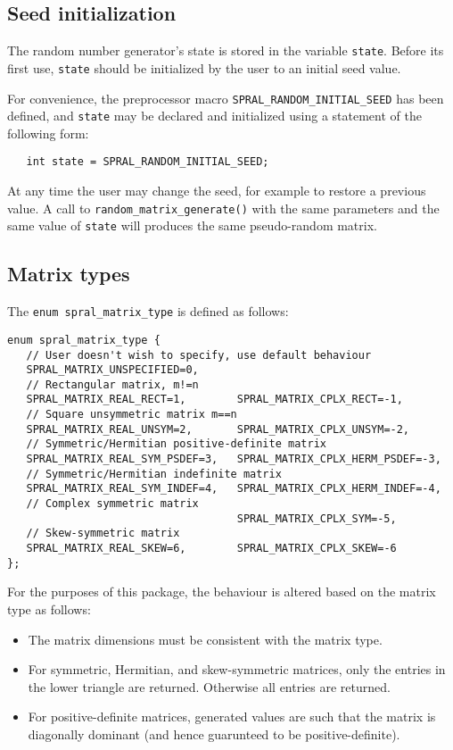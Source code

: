 \subsection{Seed initialization}
\label{random_matrix: seed initialization}
The random number generator's state is stored in the variable {\tt state}.
Before its first use, {\tt state} should be initialized by the user to an
initial seed value.

For convenience, the preprocessor macro \texttt{SPRAL\_RANDOM\_INITIAL\_SEED} has
been defined, and \texttt{state} may be declared and initialized using a statement of the
following form:
\begin{verbatim}
   int state = SPRAL_RANDOM_INITIAL_SEED;
\end{verbatim}

At any time the user may change the seed, for example to restore a previous
value. A call to \texttt{random\_matrix\_generate()} with the same parameters
and the same value of \texttt{state} will produces the same pseudo-random
matrix.

\subsection{Matrix types}
\label{random_matrix: matrix types}
The \texttt{enum spral\_matrix\_type} is defined as follows:
\begin{verbatim}
enum spral_matrix_type {
   // User doesn't wish to specify, use default behaviour
   SPRAL_MATRIX_UNSPECIFIED=0, 
   // Rectangular matrix, m!=n
   SPRAL_MATRIX_REAL_RECT=1,        SPRAL_MATRIX_CPLX_RECT=-1,
   // Square unsymmetric matrix m==n
   SPRAL_MATRIX_REAL_UNSYM=2,       SPRAL_MATRIX_CPLX_UNSYM=-2,
   // Symmetric/Hermitian positive-definite matrix
   SPRAL_MATRIX_REAL_SYM_PSDEF=3,   SPRAL_MATRIX_CPLX_HERM_PSDEF=-3,
   // Symmetric/Hermitian indefinite matrix
   SPRAL_MATRIX_REAL_SYM_INDEF=4,   SPRAL_MATRIX_CPLX_HERM_INDEF=-4,
   // Complex symmetric matrix      
                                    SPRAL_MATRIX_CPLX_SYM=-5,
   // Skew-symmetric matrix         
   SPRAL_MATRIX_REAL_SKEW=6,        SPRAL_MATRIX_CPLX_SKEW=-6
};
\end{verbatim}

For the purposes of this package, the behaviour is altered based on the matrix
type as follows:
\begin{itemize}
   \item The matrix dimensions must be consistent with the matrix type.
   \item For symmetric, Hermitian, and skew-symmetric matrices, only the
      entries in the lower triangle are returned. Otherwise all entries are
      returned.
   \item For positive-definite matrices, generated values are such that the
      matrix is diagonally dominant (and hence guarunteed to be
      positive-definite).
\end{itemize}

